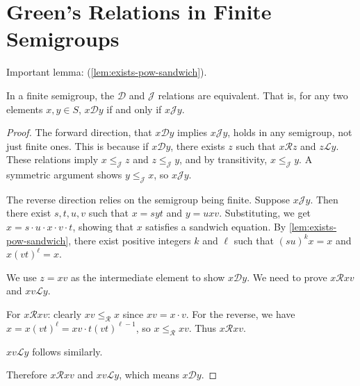 \chapter{Green's Relations in Finite Semigroups}

Important lemma: (\ref{lem:exists-pow-sandwich}).

\begin{lemma}
\label{lem:d-j-theorem}
In a finite semigroup, the $\mathcal{D}$ and $\mathcal{J}$ relations are equivalent. That is, for any two elements $x, y \in S$, $x \mathcal{D} y$ if and only if $x \mathcal{J} y$.
\leanok
{}
\end{lemma}

\begin{proof}
\leanok
The forward direction, that $x \mathcal{D} y$ implies $x \mathcal{J} y$, holds in any semigroup, not just finite ones. This is because if $x \mathcal{D} y$, there exists $z$ such that $x \mathcal{R} z$ and $z \mathcal{L} y$. These relations imply $x \leq_{\mathcal{J}} z$ and $z \leq_{\mathcal{J}} y$, and by transitivity, $x \leq_{\mathcal{J}} y$. A symmetric argument shows $y \leq_{\mathcal{J}} x$, so $x \mathcal{J} y$.

The reverse direction relies on the semigroup being finite. Suppose $x \mathcal{J} y$. Then there exist $s, t, u, v$ such that $x = syt$ and $y = uxv$. Substituting, we get $x = s \cdot u \cdot x \cdot v \cdot t$, showing that $x$ satisfies a sandwich equation. By \ref{lem:exists-pow-sandwich}, there exist positive integers $k$ and $\ell$ such that $(su)^k x = x$ and $x(vt)^\ell = x$.

We use $z = xv$ as the intermediate element to show $x \mathcal{D} y$. We need to prove $x \mathcal{R} xv$ and $xv \mathcal{L} y$.

For $x \mathcal{R} xv$: clearly $xv \leq_{\mathcal{R}} x$ since $xv = x \cdot v$. For the reverse, we have $x = x(vt)^\ell = xv \cdot t(vt)^{\ell-1}$, so $x \leq_{\mathcal{R}} xv$. Thus $x \mathcal{R} xv$.

$xv \mathcal{L} y$ follows similarly.

Therefore $x \mathcal{R} xv$ and $xv \mathcal{L} y$, which means $x \mathcal{D} y$.
\end{proof}

